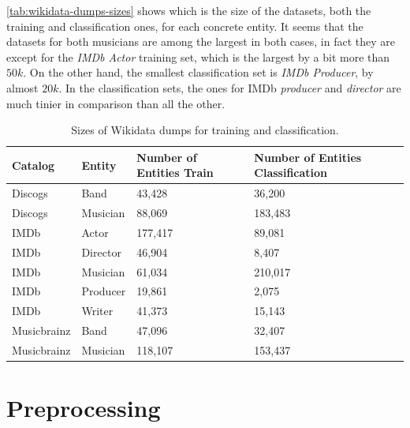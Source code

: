\documentclass[epsfig,a4paper,11pt,titlepage,twoside,openany]{book}
\begin{document}
\autoref{tab:wikidata-dumps-sizes} shows which is the size of the datasets, both the training and classification ones, for each concrete entity. It seems that the datasets for both musicians are among the largest in both cases, in fact they are except for the \textit{IMDb Actor} training set, which is the largest by a bit more than $50k$. On the other hand, the smallest classification set is \textit{IMDb Producer}, by almost $20k$. In the classification sets, the ones for IMDb \textit{producer} and \textit{director} are much tinier in comparison than all the other. 

\begin{table}[H]
\centering
\begin{tabular}{l|l|l|l}
\textbf{Catalog}     & \textbf{Entity}   & \textbf{Number of Entities Train} & \textbf{Number of Entities Classification} \\ \hline
Discogs     & Band     & 43,428                   & 36,200                            \\ \hline
Discogs     & Musician & 88,069                   & 183,483                           \\ \hline
IMDb        & Actor    & 177,417                  & 89,081                            \\ \hline
IMDb        & Director & 46,904                   & 8,407                             \\ \hline
IMDb        & Musician & 61,034                   & 210,017                           \\ \hline
IMDb        & Producer & 19,861                   & 2,075                             \\ \hline
IMDb        & Writer   & 41,373                   & 15,143                            \\ \hline
Musicbrainz & Band     & 47,096                   & 32,407                            \\ \hline
Musicbrainz & Musician & 118,107                  & 153,437                           \\ \hline
\end{tabular}
\caption{Sizes of Wikidata dumps for training and classification.}
\label{tab:wikidata-dumps-sizes}
\end{table}



\section{Preprocessing}
\label{sec:data-preprocessing}
\end{document}
